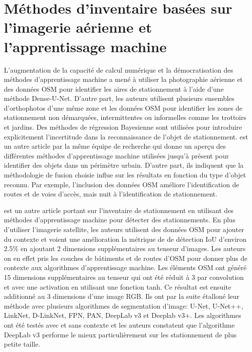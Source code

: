 \section{Méthodes d'inventaire basées sur l'imagerie aérienne et l'apprentissage machine}
  L'augmentation de la capacité de calcul numérique et la démocratisation des méthodes d'apprentissage machine a mené \textcite{hellekes_parking_2023} à utiliser la photographie aérienne et des données \ac{OSM} pour identifier les aires de stationnement à l'aide d'une méthode Dense-U-Net. D'autre part, les auteurs utilisent plusieurs ensembles d'orthophotos d'une même zone et les données \ac{OSM} pour identifier les zones de stationnement non démarquées, intermittentes ou informelles comme les trottoirs et jardins. Des méthodes de régression Bayesienne sont utilisées pour introduire explicitement l'incertitude dans la reconnaissance de l'objet de stationnement. \textcite{henry_citywide_2021} est un autre article par la même équipe de recherche qui donne un aperçu des différentes méthodes d'apprentissage machine utilisées jusqu'à présent pour identifier des objets dans un périmètre urbain. D'autre part, ils indiquent que la méthodologie de fusion choisie influe sur les résultats en fonction du type d'objet reconnu. Par exemple, l'inclusion des données \ac{OSM} améliore l'identification de routes et de voies d'accès, mais nuit à l'identification de stationnement.  \par
  \textcite{yin_context-enriched_2022} est un autre article portant sur l'inventaire de stationnement en utilisant des méthodes d'apprentissage machine pour détecter des stationnements. En plus d'utiliser l'imagerie satellite, les auteurs utilisent des données \ac{OSM} pour ajouter du contexte et voient une amélioration la métrique de de détection \ac{IoU} d'environ 2.5\% en ajoutant 2 dimensions supplémentaires au tenseur d'images. Les auteurs on en effet pris les couches de bâtiments et de routes d'\ac{OSM} pour donner plus de contexte aux algorithmes d'apprentissage machine. Les éléments \ac{OSM} ont généré 15 dimensions supplémentaires au tenseur qui ont été réduit à 3 par convolution et avec une activation en utilisant une fonction tanh. Ce résultat est ensuite additionné au 3 dimensions d'une image RGB. Ils ont par la suite étalloné leur méthode avec plusieurs algorithmes de segmentation d'image: U-Net, U-Net++, LinkNet, D-LinkNet, FPN, PAN, DeepLab v3 et Deeplab v3+. Les algorithmes ont été testés avec et sans contexte et les auteurs constatent que l'algorithme DeepLab v3 performe le mieux particulièrement sur les stationnement de plus petite taille.